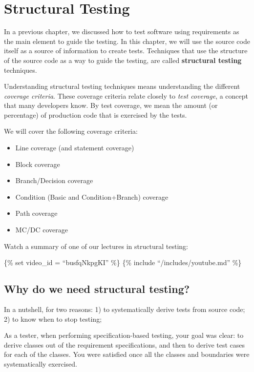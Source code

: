 \hypertarget{structural-testing}{%
\section{Structural Testing}\label{structural-testing}}

In a previous chapter, we discussed how to test software using
requirements as the main element to guide the testing. In this chapter,
we will use the source code itself as a source of information to create
tests. Techniques that use the structure of the source code as a way to
guide the testing, are called \textbf{structural testing} techniques.

Understanding structural testing techniques means understanding the
different \emph{coverage criteria}. These coverage criteria relate
closely to \emph{test coverage}, a concept that many developers know. By
test coverage, we mean the amount (or percentage) of production code
that is exercised by the tests.

We will cover the following coverage criteria:

\begin{itemize}
\tightlist
\item
  Line coverage (and statement coverage)
\item
  Block coverage
\item
  Branch/Decision coverage
\item
  Condition (Basic and Condition+Branch) coverage
\item
  Path coverage
\item
  MC/DC coverage
\end{itemize}

Watch a summary of one of our lectures in structural testing:

\{\% set video\_id = ``busfqNkpgKI'' \%\} \{\% include
``/includes/youtube.md'' \%\}

\hypertarget{why-do-we-need-structural-testing}{%
\subsection{Why do we need structural
testing?}\label{why-do-we-need-structural-testing}}

In a nutshell, for two reasons: 1) to systematically derive tests from
source code; 2) to know when to stop testing;

As a tester, when performing specification-based testing, your goal was
clear: to derive classes out of the requirement specifications, and then
to derive test cases for each of the classes. You were satisfied once
all the classes and boundaries were systematically exercised.

